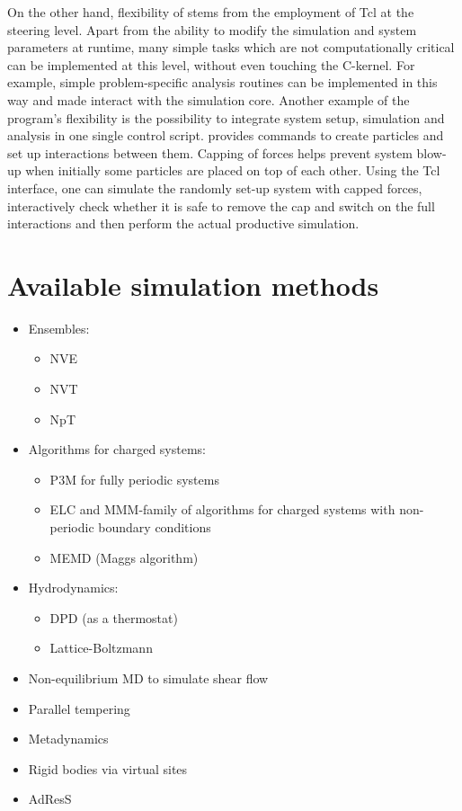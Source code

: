 On the other hand, flexibility of \es stems from the employment of Tcl
at the steering level. Apart from the ability to modify the simulation
and system parameters at runtime, many simple tasks which are not
computationally critical can be implemented at this level, without
even touching the C-kernel.  For example, simple problem-specific
analysis routines can be implemented in this way and made interact
with the simulation core.  Another example of the program's
flexibility is the possibility to integrate system setup, simulation and
analysis in one single control script. \es provides commands to create
particles and set up interactions between them.  Capping of forces
helps prevent system blow-up when initially some particles are placed
on top of each other. Using the Tcl interface, one can simulate the
randomly set-up system with capped forces, interactively check whether
it is safe to remove the cap and switch on the full interactions and
then perform the actual productive simulation.

\section{Available simulation methods}

\begin{itemize}
\item Ensembles: 
  \begin{itemize} 
  \item NVE
  \item NVT
  \item NpT
  \end{itemize}
\item Algorithms for charged systems:
  \begin{itemize}
  \item P3M for fully periodic systems
  \item ELC and MMM-family of algorithms for charged systems with
    non-periodic boundary conditions
  \item MEMD (Maggs algorithm)
  \end{itemize}
\item Hydrodynamics:
  \begin{itemize}
  \item DPD (as a thermostat)
  \item Lattice-Boltzmann
  \end{itemize}
\item Non-equilibrium MD to simulate shear flow
\item Parallel tempering
\item Metadynamics
\item Rigid bodies via virtual sites
\item AdResS
\end{itemize}

